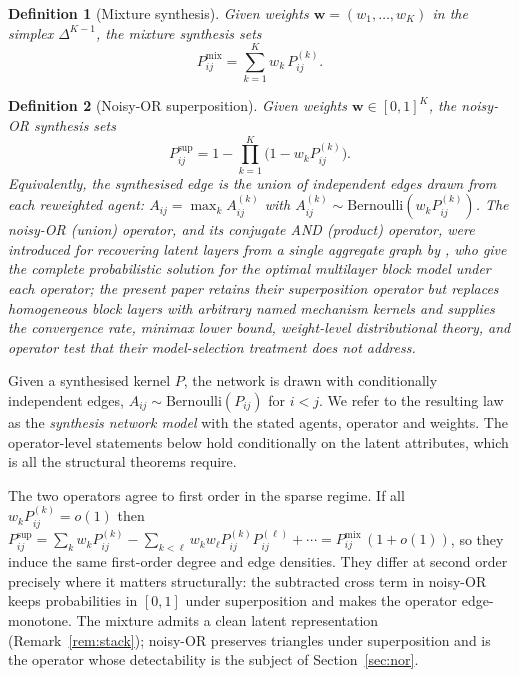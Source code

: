 \documentclass[12pt]{article}
\newtheorem{definition}{Definition}
\newcommand{\1}{\mathbf{1}}
\newcommand{\bw}{\mathbf{w}}
\begin{document}
\begin{definition}[Mixture synthesis]
\label{def:mixture}
Given weights $\bw=(w_1,\dots,w_K)$ in the simplex $\Delta^{K-1}$, the \emph{mixture} synthesis sets
\[
P^{\mathrm{mix}}_{ij}=\sum_{k=1}^{K}w_k\,P^{(k)}_{ij}.
\]
\end{definition}

\begin{definition}[Noisy-OR superposition]
\label{def:noisyor}
Given weights $\bw\in[0,1]^K$, the \emph{noisy-OR} synthesis sets
\[
P^{\mathrm{sup}}_{ij}=1-\prod_{k=1}^{K}\bigl(1-w_k P^{(k)}_{ij}\bigr).
\]
Equivalently, the synthesised edge is the union of independent edges drawn from each reweighted
agent: $A_{ij}=\max_k A^{(k)}_{ij}$ with $A^{(k)}_{ij}\sim\mathrm{Bernoulli}(w_k P^{(k)}_{ij})$.
The noisy-OR (union) operator, and its conjugate AND (product) operator, were introduced for
recovering latent layers from a single aggregate graph by \citet{valles2016multilayer}, who give the
complete probabilistic solution for the optimal multilayer block model under each operator; the
present paper retains their superposition operator but replaces homogeneous block layers with
arbitrary named mechanism kernels and supplies the convergence rate,
minimax lower bound, weight-level distributional theory, and operator test that their
model-selection treatment does not address.
\end{definition}

Given a synthesised kernel $P$, the network is drawn with conditionally independent edges,
$A_{ij}\sim\mathrm{Bernoulli}(P_{ij})$ for $i<j$. We refer to the resulting law as the
\emph{synthesis network model} with the stated agents, operator and weights. The
operator-level statements below hold conditionally on the latent attributes, which is all the
structural theorems require.

The two operators agree to first order in the sparse regime. If all $w_kP^{(k)}_{ij}=o(1)$ then
$P^{\mathrm{sup}}_{ij}=\sum_k w_kP^{(k)}_{ij}-\sum_{k<\ell}w_kw_\ell P^{(k)}_{ij}P^{(\ell)}_{ij}+\cdots
=P^{\mathrm{mix}}_{ij}\,(1+o(1))$, so they induce the same first-order degree and edge densities.
They differ at second order precisely where it matters structurally: the subtracted cross term in
noisy-OR keeps probabilities in $[0,1]$ under superposition and makes the operator
edge-monotone. The mixture admits a clean latent representation (Remark~\ref{rem:stack}); noisy-OR
preserves triangles under superposition and is the operator whose detectability is the subject of
Section~\ref{sec:nor}.
\end{document}
